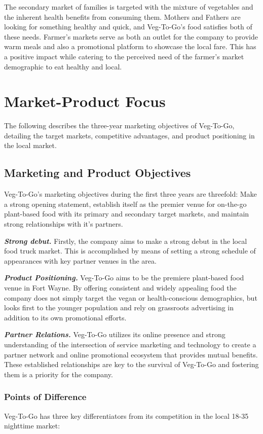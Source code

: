 \documentclass[12pt, letterpaper]{article}
\newcommand{\companyname}{Veg-To-Go}
\begin{document}
The secondary market of families is targeted with the mixture of vegetables and the inherent health benefits from consuming them.  Mothers and Fathers are looking for something healthy and quick, and \companyname{}'s food satisfies both of these needs. Farmer's markets serve as both an outlet for the company to provide warm meals and also a promotional platform to showcase the local fare. This has a positive impact while catering to the perceived need of the farmer's market demographic to eat healthy and local.

\newpage

\section{Market-Product Focus}
The following describes the three-year marketing objectives of \companyname{}, detailing the target markets, competitive advantages, and product positioning in the local market.
\subsection{Marketing and Product Objectives}
\companyname's{} marketing objectives during the first three years are threefold:  Make a strong opening statement, establish itself as the premier venue for on-the-go plant-based food with its primary and secondary target markets, and maintain strong relationships with it's partners.

\textbf{\emph{Strong debut.}} Firstly, the company aims to make a strong debut in the local food truck market.  This is accomplished by means of setting a strong schedule of appearances with key partner venues in the area.

\textbf{\emph{Product Positioning.}} \companyname{} aims to be the premiere plant-based food venue in Fort Wayne.  By offering consistent and widely appealing food the company does not simply target the vegan or health-conscious demographics, but looks first to the younger population and rely on grassroots advertising in addition to its own promotional efforts.

\textbf{\emph{Partner Relations.}} \companyname{} utilizes its online presence and strong understanding of the intersection of service marketing and technology to create a partner network and online promotional ecosystem that provides mutual benefits. These established relationships are key to the survival of \companyname{} and fostering them is a priority for the company.

\subsubsection{Points of Difference}
\companyname{} has three key differentiators from its competition in the local 18-35 nighttime market:
\end{document}
